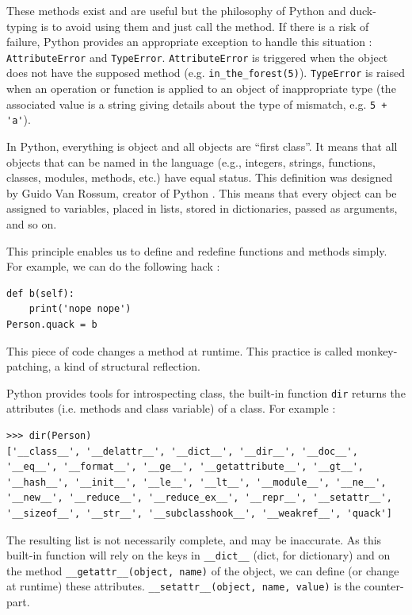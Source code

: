 \documentclass[a4paper,10pt]{article}
\begin{document}
These methods exist and are useful but the philosophy of Python and duck-typing is to avoid using them and just call the method.
If there is a risk of failure, Python provides an appropriate exception to handle this situation : \lstinline|AttributeError| and \lstinline|TypeError|.
\lstinline|AttributeError| is triggered when the object does not have the supposed method (e.g. \lstinline|in_the_forest(5)|).
\lstinline|TypeError| is raised when an operation or function is applied to an object of inappropriate type (the associated value is a string giving details about the type of mismatch, e.g. \mbox{\lstinline|5 + 'a'|}).

In Python, everything is object and all objects are ``first class''.
It means that all objects that can be named in the language (e.g., integers, strings, functions, classes, modules, methods, etc.) have equal status.
This definition was designed by Guido Van Rossum, creator of Python \cite{ wiki:python}.
This means that every object can be assigned to variables, placed in lists, stored in dictionaries, passed as arguments, and so on.

This principle enables us to define and redefine functions and methods simply. For example, we can do the following hack :

\begin{lstlisting}
def b(self):
    print('nope nope')
Person.quack = b
\end{lstlisting}


This piece of code changes a method at runtime. This practice is called monkey-patching, a kind of structural reflection.

Python provides tools for introspecting class, the built-in function \lstinline|dir| \cite{ python:fct} returns the attributes (i.e. methods and class variable) of a class. For example :
\begin{lstlisting}
>>> dir(Person)
['__class__', '__delattr__', '__dict__', '__dir__', '__doc__', '__eq__', '__format__', '__ge__', '__getattribute__', '__gt__', '__hash__', '__init__', '__le__', '__lt__', '__module__', '__ne__', '__new__', '__reduce__', '__reduce_ex__', '__repr__', '__setattr__', '__sizeof__', '__str__', '__subclasshook__', '__weakref__', 'quack']
\end{lstlisting}

The resulting list is not necessarily complete, and may be inaccurate. As this built-in function will rely on the keys in \lstinline|__dict__| (dict, for dictionary) and on the method \lstinline|__getattr__(object, name)| of the object, we can define (or change at runtime) these attributes. \lstinline|__setattr__(object, name, value)| is the counter-part.
\end{document}
